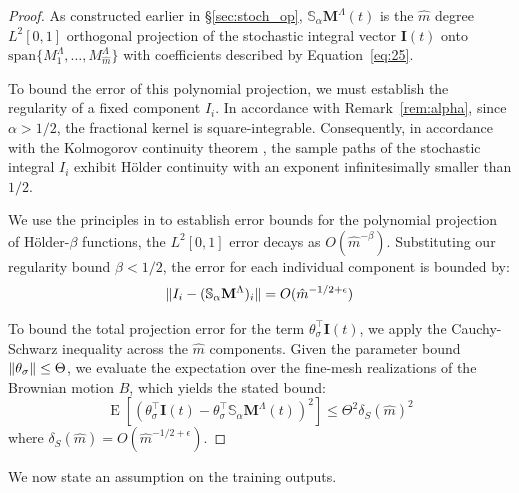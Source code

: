 \documentclass[11pt, a4paper]{article}
\theoremstyle{theoremstyle}
\theoremstyle{definitionstyle}
\DeclareMathOperator{\EE}{\mathrm E}
\DeclarePairedDelimiter{\norm}{\lVert}{\rVert}
\begin{document}
\begin{proof}
    As constructed earlier in \S\ref{sec:stoch_op}, \( \mathbb S_\alpha \mathbf M^\Lambda (t) \) is the \( \hat m \) degree \( L^2[0, 1] \) orthogonal projection of the stochastic integral vector \( \mathbf I(t) \) onto \(\mathrm{span} \{M_1^\Lambda, \dots , M_{\hat m}^\Lambda\}\) with coefficients described by Equation~\ref{eq:25}.

    To bound the error of this polynomial projection, we must establish the regularity of a fixed component \( I_i \). In accordance with Remark~\ref{rem:alpha}, since \( \alpha > 1/2 \), the fractional kernel is square-integrable. Consequently, in accordance with the Kolmogorov continuity theorem \cite[Theorem 2.2.3]{oksendal2003stochastic}, the sample paths of the stochastic integral \( I_i \) exhibit H\"older continuity with an exponent infinitesimally smaller than \( 1/2 \). 

    We use the principles in \cite[\S 7.6]{devore1993constructive} to establish error bounds for the polynomial projection of Hölder-\(\beta\) functions, the \( L^2[0,1] \) error decays as \( O(\hat{m}^{-\beta}) \). Substituting our regularity bound \(\beta < 1/2 \), the error for each individual component is bounded by:
    \begin{equation}
        \norm{I_i - (\mathbb{S}_\alpha \mathbf{M}^\Lambda)_i} = O(\hat{m}^{-1/2+\epsilon})
    \end{equation}
    
    To bound the total projection error for the term \( \theta_\sigma^\top \mathbf{I}(t) \), we apply the Cauchy-Schwarz inequality across the \( \hat{m} \) components. Given the parameter bound \( \norm{\theta_\sigma} \leq \Theta \), we evaluate the expectation over the fine-mesh realizations of the Brownian motion \( B \), which yields the stated bound:
    \begin{equation}
        \EE \left[ \left ( \theta_\sigma^\top \mathbf{I}(t) - \theta_\sigma^\top \mathbb S_\alpha \mathbf M^\Lambda(t) \right )^2 \right] \le \Theta^2 \delta_S(\hat{m})^2
    \end{equation}
    where \( \delta_S(\hat{m}) = O(\hat{m}^{-1/2+\epsilon}) \).
\end{proof}

We now state an assumption on the training outputs.
\end{document}
